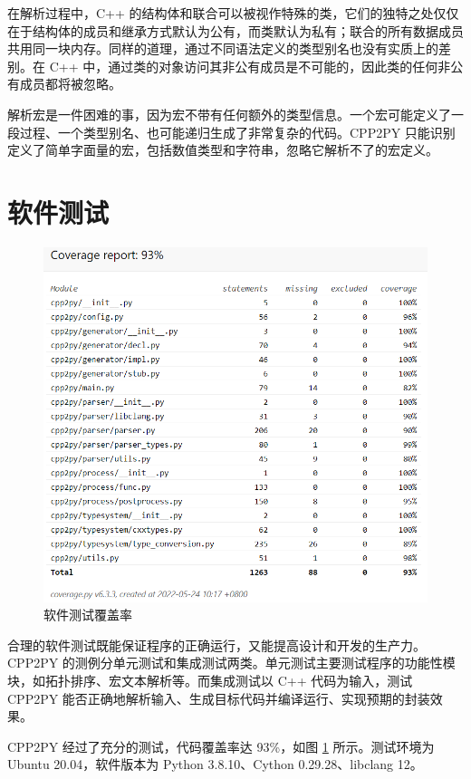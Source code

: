 在解析过程中，C++ 的结构体和联合可以被视作特殊的类，它们的独特之处仅仅在于结构体的成员和继承方式默认为公有，而类默认为私有；联合的所有数据成员共用同一块内存。同样的道理，通过不同语法定义的类型别名也没有实质上的差别。在 C++ 中，通过类的对象访问其非公有成员是不可能的，因此类的任何非公有成员都将被忽略。

解析宏是一件困难的事，因为宏不带有任何额外的类型信息。一个宏可能定义了一段过程、一个类型别名、也可能递归生成了非常复杂的代码。CPP2PY 只能识别定义了简单字面量的宏，包括数值类型和字符串，忽略它解析不了的宏定义。


\section{软件测试}

\begin{figure}
  \centering
  \includegraphics[width=\linewidth]{figures/测试覆盖.png}
  \caption{软件测试覆盖率}
  \label{fig:2.5}
\end{figure}

合理的软件测试既能保证程序的正确运行，又能提高设计和开发的生产力。CPP2PY 的测例分单元测试和集成测试两类。单元测试主要测试程序的功能性模块，如拓扑排序、宏文本解析等。而集成测试以 C++ 代码为输入，测试 CPP2PY 能否正确地解析输入、生成目标代码并编译运行、实现预期的封装效果。

CPP2PY 经过了充分的测试，代码覆盖率达 93\%，如图 \ref{fig:2.5} 所示。测试环境为 Ubuntu 20.04，软件版本为 Python 3.8.10、Cython 0.29.28、libclang 12。
